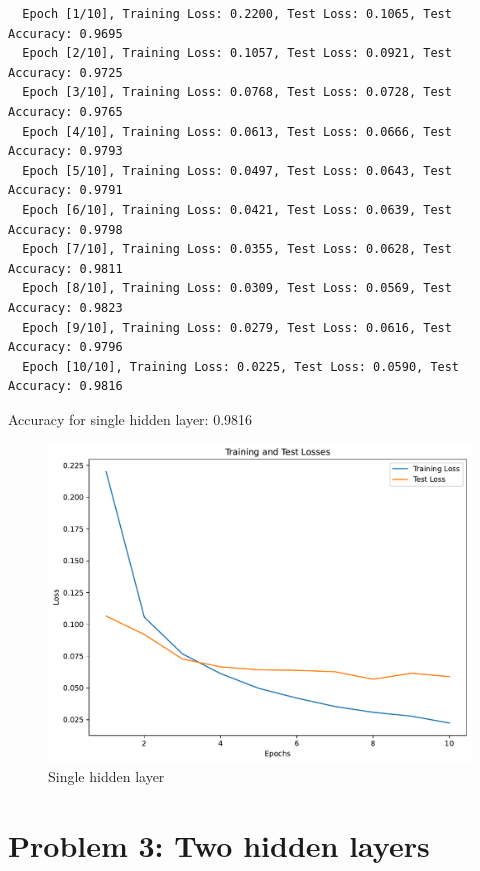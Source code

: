 \documentclass[a4paper]{article}
\begin{document}
\begin{verbatim}
  Epoch [1/10], Training Loss: 0.2200, Test Loss: 0.1065, Test Accuracy: 0.9695
  Epoch [2/10], Training Loss: 0.1057, Test Loss: 0.0921, Test Accuracy: 0.9725
  Epoch [3/10], Training Loss: 0.0768, Test Loss: 0.0728, Test Accuracy: 0.9765
  Epoch [4/10], Training Loss: 0.0613, Test Loss: 0.0666, Test Accuracy: 0.9793
  Epoch [5/10], Training Loss: 0.0497, Test Loss: 0.0643, Test Accuracy: 0.9791
  Epoch [6/10], Training Loss: 0.0421, Test Loss: 0.0639, Test Accuracy: 0.9798
  Epoch [7/10], Training Loss: 0.0355, Test Loss: 0.0628, Test Accuracy: 0.9811
  Epoch [8/10], Training Loss: 0.0309, Test Loss: 0.0569, Test Accuracy: 0.9823
  Epoch [9/10], Training Loss: 0.0279, Test Loss: 0.0616, Test Accuracy: 0.9796
  Epoch [10/10], Training Loss: 0.0225, Test Loss: 0.0590, Test Accuracy: 0.9816
\end{verbatim}

Accuracy for single hidden layer: 0.9816

\begin{figure}[H]
  \begin{center}
    \includegraphics[width=\textwidth]{ola/single_hidden_layer.pdf}
    \caption{Single hidden layer}
    \label{fig:single_hidden_layer}
  \end{center}
\end{figure}

\section*{Problem 3: Two hidden layers}
\end{document}
